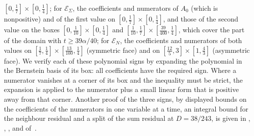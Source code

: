 $[0,\frac17]\times[0,\frac14]$; for $\mathcal E_\Sigma$, the coefficients and numerators of $A_0$
(which is nonpositive) and of the first value on $[0,\frac17]\times[0,\frac14]$, and those of the
second value on the boxes $[0,\frac1{10}]\times[0,\frac14]$ and
$[\frac1{10},\frac17]\times[\frac{39}{400},\frac14]$, which cover the part of the domain with
$t\ge39\alpha/40$; for $\mathcal E_N$, the coefficients and numerators of both values on
$[\frac17,\frac14]\times[\frac{13}{100},\frac14]$ (symmetric face) and on
$[\frac{12}5,3]\times[1,\frac43]$ (asymmetric face). We verify each of these polynomial signs by
expanding the polynomial in the Bernstein basis of its box: all coefficients have the required
sign. Where a numerator vanishes at a corner of its box and the inequality must be strict, the
expansion is applied to the numerator plus a small linear form that is positive away from that
corner. Another proof of the three signs, by displayed bounds on the coefficients of the numerators
in one variable at a time, an integral bound for the neighbour residual and a split of the sum
residual at $D=38/243$, is given in ,
, ,
 and 
of~\cite{Notes}.

